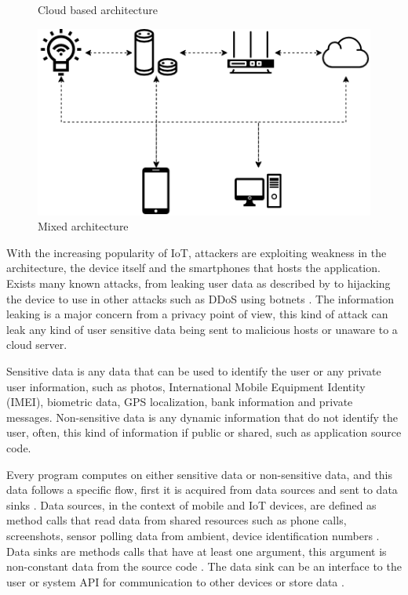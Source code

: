 \begin{figure}[ht]
\begin{minipage}[b]{0.5\linewidth}
        \caption{Cloud based architecture}\label{fig:arch-cloud}
        \vspace{4ex}
    \end{minipage}%
    \begin{minipage}[b]{0.5\linewidth}
        \centering
        \includegraphics[width=1\linewidth]{images/iot-architectures/mixed.png}
        \caption{Mixed architecture}\label{fig:arch-mixed}
        \vspace{4ex}
    \end{minipage} 
\end{figure}

With the increasing popularity of IoT, attackers are exploiting weakness in the architecture, the device itself and the smartphones that hosts the application. Exists many known attacks, from leaking user data as described by \cite{ycraig} to hijacking the device to use in other attacks such as DDoS using botnets \cite{kolias2017ddos}. The information leaking is a major concern from a privacy point of view, this kind of attack can leak any kind of user sensitive data being sent to malicious hosts or unaware to a cloud server. 

Sensitive data is any data that can be used to identify the user or any private user information, such as photos, International Mobile Equipment Identity (IMEI), biometric data, GPS localization, bank information and private messages. Non-sensitive data is any dynamic information that do not identify the user, often, this kind of information if public or shared, such as application source code.

Every program computes on either sensitive data or non-sensitive data, and this data follows a specific flow, first it is acquired from data sources and sent to data sinks \citep{mccabe2003network}. Data sources, in the context of mobile and IoT devices, are defined as method calls that read data from shared resources such as phone calls, screenshots, sensor polling data from ambient, device identification numbers \citep{rasthofer2014machine}. Data sinks are methods calls that have at least one argument, this argument is non-constant data from the source code \citep{rasthofer2014machine}. The data sink can be an interface to the user or system API for communication to other devices or store data \citep{viet2010specifying}.

